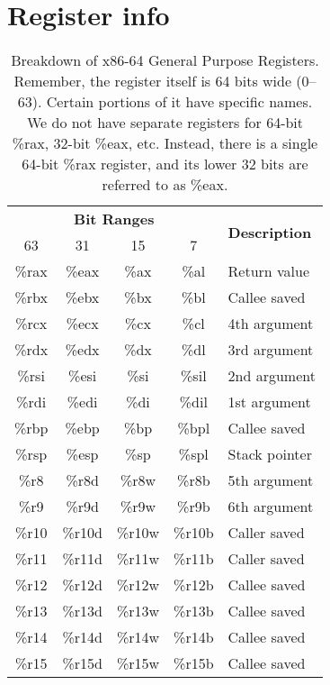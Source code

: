 \section{Register info}
\label{sec:reg-info}
\renewcommand{\arraystretch}{1.5}
\setlength{\tabcolsep}{8pt}
%
\begin{table}[h]
    \centering
    \begin{tabular}{|c|c|c|c|l|}
        \hline
        \multicolumn{4}{|c|}{\textbf{Bit Ranges}} & \multirow{2}{*}{\textbf{Description}} \\
        \cline{1-4}
        63 & 31 & 15 & 7 &  \\
        \hline
        \%rax  & \%eax  & \%ax  & \%al  & Return value \\
        \%rbx  & \%ebx  & \%bx  & \%bl  & Callee saved \\
        \%rcx  & \%ecx  & \%cx  & \%cl  & 4th argument \\
        \%rdx  & \%edx  & \%dx  & \%dl  & 3rd argument \\
        \%rsi  & \%esi  & \%si  & \%sil & 2nd argument \\
        \%rdi  & \%edi  & \%di  & \%dil & 1st argument \\
        \%rbp  & \%ebp  & \%bp  & \%bpl & Callee saved \\
        \%rsp  & \%esp  & \%sp  & \%spl & Stack pointer \\
        \%r8   & \%r8d  & \%r8w  & \%r8b  & 5th argument \\
        \%r9   & \%r9d  & \%r9w  & \%r9b  & 6th argument \\
        \%r10  & \%r10d & \%r10w & \%r10b & Caller saved \\
        \%r11  & \%r11d & \%r11w & \%r11b & Caller saved \\
        \%r12  & \%r12d & \%r12w & \%r12b & Callee saved \\
        \%r13  & \%r13d & \%r13w & \%r13b & Callee saved \\
        \%r14  & \%r14d & \%r14w & \%r14b & Callee saved \\
        \%r15  & \%r15d & \%r15w & \%r15b & Callee saved \\
        \hline
    \end{tabular}
    \caption{Breakdown of x86-64 General Purpose Registers. Remember, the register itself is 64 bits wide (0–63). Certain portions of it have specific names. We do not have separate registers for 64-bit \%rax, 32-bit \%eax, etc. Instead, there is a single 64-bit \%rax register, and its lower 32 bits are referred to as \%eax.}
    \label{tab:x86_64_registers}
\end{table}
%
\clearpage
%
